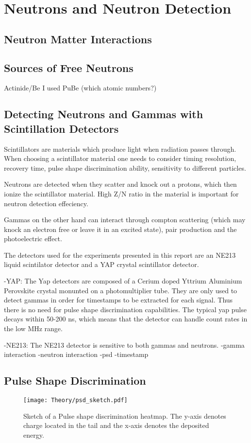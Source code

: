 \documentclass[main.tex]{subfiles}
\begin{document}
\section{Neutrons and Neutron Detection}

\subsection{Neutron Matter Interactions}

\subsection{Sources of Free Neutrons}
Actinide/Be
I used PuBe (which atomic numbers?)

\subsection{Detecting Neutrons and Gammas with Scintillation Detectors}
Scintillators are materials which produce light when radiation passes through. When choosing a scintillator material one needs to consider timing resolution, recovery time, pulse shape discrimination ability, sensitivity to different particles.

Neutrons are detected when they scatter and knock out a protons, which then ionize the scintillator material. High Z/N ratio in the material is important for neutron detection effeciency.

Gammas on the other hand can interact through compton scattering (which may knock an electron free or leave it in an excited state), pair production and the photoelectric effect.

The detectors used for the experiments presented in this report are an NE213 liquid scintilator detector and a YAP crystal scintillator detector.

-YAP: The Yap detectors are composed of a Cerium doped Yttrium Aluminium Perovskite crystal monunted on a photomultiplier tube.
They are only used to detect gammas in order for timestamps to be extracted for each signal. Thus there is no need for pulse shape discrimination capabilities. The typical yap pulse decays within 50-200 ns, which means that the detector can handle count rates in the low MHz range.

-NE213: The NE213 detector is sensitive to both gammas and neutrons. 
-gamma interaction
-neutron interaction
-psd
-timestamp

\subsection{Pulse Shape Discrimination}
\begin{figure}[ht]
    \centering
        \texttt{[image: Theory/psd\_sketch.pdf]}
        \caption{Sketch of a Pulse shape discrimination heatmap. The y-axis denotes charge located in the tail and the x-axis denotes the deposited energy.}
    \label{fig:psd_sketch} 
\end{figure}
\end{document}
